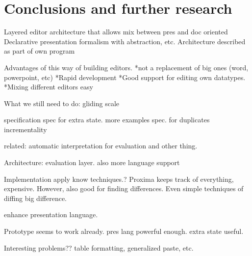 \chapter{Conclusions and further research}
\label{chap:conclusions}


Layered editor architecture that allows mix between pres and doc oriented
Declarative presentation formalism with abstraction, etc.
Architecture described as part of own program

Advantages of this way of building editors.
*not a replacement of big ones (word, powerpoint, etc)
*Rapid development
*Good support for editing own datatypes.
*Mixing different editors easy

What we still need to do: gliding scale

specification
spec for extra state. more examples
spec. for duplicates
incrementality

related: automatic interpretation for evaluation and other thing.

Architecture:
evaluation layer. also more language support

Implementation
apply know techniques.?
Proxima keeps track of everything, expensive. However, also good for finding differences. Even simple techniques of diffing big difference.

enhance presentation language.

Prototype seems to work already. pres lang powerful enough. extra state useful. 



Interesting problems?? table formatting, generalized paste, etc.